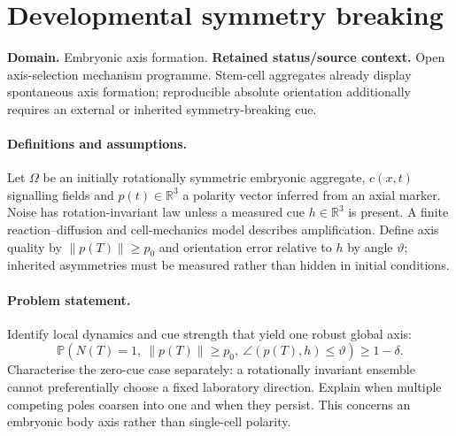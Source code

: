 \documentclass[11pt]{article}
\begin{document}
\section*{Developmental symmetry breaking}
\label{prob:123}
\label{rank:232}
\par\smallskip

\noindent\textbf{Domain.} Embryonic axis formation. \quad \textbf{Retained status/source context.} Open axis-selection mechanism programme. Stem-cell aggregates already display spontaneous axis formation; reproducible absolute orientation additionally requires an external or inherited symmetry-breaking cue.
\paragraph{Definitions and assumptions.} Let $\Omega$ be an initially rotationally symmetric embryonic aggregate, $c(x,t)$ signalling fields and $p(t)\in\mathbb{R}^3$ a polarity vector inferred from an axial marker. Noise has rotation-invariant law unless a measured cue $h\in\mathbb{R}^3$ is present. A finite reaction--diffusion and cell-mechanics model describes amplification. Define axis quality by $\|p(T)\|\geq p_0$ and orientation error relative to $h$ by angle $\vartheta$; inherited asymmetries must be measured rather than hidden in initial conditions.
\paragraph{Problem statement.} Identify local dynamics and cue strength that yield one robust global axis:
\[
\mathbb{P}\!\left(N(T)=1,\ \|p(T)\|\geq p_0,\ \angle(p(T),h)\leq\vartheta\right)\geq1-\delta.
\]
Characterise the zero-cue case separately: a rotationally invariant ensemble cannot preferentially choose a fixed laboratory direction. Explain when multiple competing poles coarsen into one and when they persist. This concerns an embryonic body axis rather than single-cell polarity.
\end{document}
